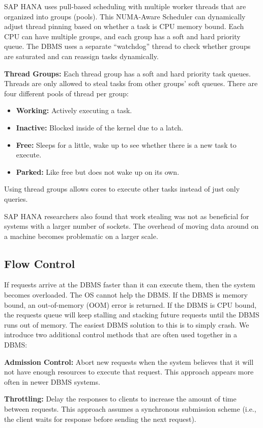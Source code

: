\documentclass[11pt]{article}
\begin{document}
SAP HANA uses pull-based scheduling with multiple worker threads that are organized into groups (pools). This NUMA-Aware Scheduler can dynamically adjust thread pinning based on whether a task is CPU memory bound. Each CPU can have multiple groups, and each group has a soft and hard priority queue. The DBMS uses a separate “watchdog” thread to check whether groups are saturated and can reassign tasks dynamically.

\textbf{Thread Groups: } Each thread group has a soft and hard priority task queues. Threads are only allowed to steal tasks from other groups’ soft queues. There are four different pools of thread per group:
\begin{itemize}
 \item \textbf{Working: }Actively executing a task.
 \item \textbf{Inactive: }Blocked inside of the kernel due to a latch.
 \item \textbf{Free: }Sleeps for a little, wake up to see whether there is a new task to execute.
 \item \textbf{Parked: }Like free but does not wake up on its own.
\end{itemize}
Using thread groups allows cores to execute other tasks instead of just only queries.

SAP HANA researchers also found that work stealing was not as beneficial for systems with a larger number of sockets. The overhead of moving data around on a machine becomes problematic on a larger scale.

\subsection*{Flow Control}
If requests arrive at the DBMS faster than it can execute them, then the system becomes overloaded. The OS cannot help the DBMS. If the DBMS is memory bound, an out-of-memory (OOM) error is returned. If the DBMS is CPU bound, the requests queue will keep stalling and stacking future requests until the DBMS runs out of memory. The easiest DBMS solution to this is to simply crash. We introduce two additional control methods that are often used together in a DBMS:

\textbf{Admission Control: }Abort new requests when the system believes that it will not have enough resources to execute that request. This approach appears more often in newer DBMS systems.

\textbf{Throttling: }Delay the responses to clients to increase the amount of time between requests. This approach assumes a synchronous submission scheme (i.e., the client waits for response before sending the next request).

\newpage


\end{document}
